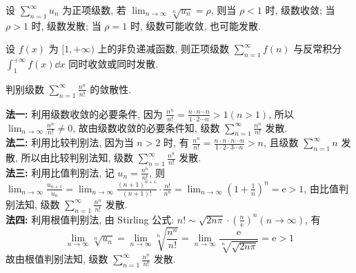 \begin{theorem}[根值审敛法]
    设 $\displaystyle \sum_{n=1}^{\infty} u_{n} $ 为正项级数, 若 $\displaystyle \lim _{n \rightarrow \infty} \sqrt[n]{u_{n}}=\rho $, 则当 $ \rho<1 $ 时, 级数收敛;
    当 $ \rho>1 $ 时, 级数发散; 当 $ \rho=1 $ 时, 级数可能收敛, 也可能发散.
\end{theorem}

\begin{theorem}[积分判别法]
    设 $ f(x) $ 为 $ [1,+\infty) $ 上的非负递减函数, 则正项级数 $\displaystyle  \sum_{n=1}^{\infty} f(n) $ 与反常积分 $\displaystyle \int_{1}^{+\infty} f(x) \dd x $ 同时收敛或同时发散.
\end{theorem}

\begin{example}
    判别级数 $\displaystyle  \sum_{n=1}^{\infty} \frac{n^{n}}{n!} $ 的敛散性.
\end{example}
\begin{solution}
    \textbf{法一: }利用级数收敛的必要条件, 因为 $\displaystyle  \frac{n^{n}}{n!}=\frac{n \cdot n \cdots n}{1 \cdot 2 \cdots n}>1(n>1) $, 所以 $\displaystyle  \lim _{n \rightarrow \infty} \frac{n^{n}}{n!} \neq 0 $, 故由级数收敛的必要条件知, 级数 $\displaystyle  \sum_{n=1}^{\infty} \frac{n^{n}}{n!} $ 发散.\\ 
    \textbf{法二: }利用比较判别法, 因为当 $ n>2 $ 时, 有 $\displaystyle  \frac{n^{n}}{n!}=\frac{n \cdot n \cdot n \cdots n}{1 \cdot 2 \cdot 3 \cdots n}>n $, 且级数 $\displaystyle  \sum_{n=1}^{\infty} n $ 发散, 所以由比较判别法知, 级数 $\displaystyle  \sum_{n=1}^{\infty} \frac{n^{n}}{n!} $ 发散.\\ 
    \textbf{法三: }利用比值判别法, 记 $\displaystyle  u_{n}=\frac{n^{n}}{n!} $, 则 $\displaystyle  \lim _{n \rightarrow \infty} \frac{u_{n+1}}{u_{n}}=\lim _{n \rightarrow \infty} \frac{(n+1)^{n+1}}{(n+1)!} \cdot \frac{n!}{n^{n}}=\lim _{n \rightarrow \infty}\left(1+\frac{1}{n}\right)^{n}=\mathrm{e}>1 $, 由比值判别法知, 级数 $\displaystyle  \sum_{n=1}^{\infty} \frac{n^{n}}{n!} $ 发散.\\ 
    \textbf{法四: }利用根值判别法, 由 Stirling 公式: $\displaystyle  n!\sim \sqrt{2 n \pi} \cdot\left(\frac{n}{\mathrm{e}}\right)^{n}(n \rightarrow \infty) $, 有
    $$
    \lim _{n \rightarrow \infty} \sqrt[n]{u_{n}}=\lim _{n \rightarrow \infty} \sqrt[n]{\frac{n^{n}}{n!}}=\lim _{n \rightarrow \infty} \frac{\mathrm{e}}{\sqrt[n]{\sqrt{2 n \pi}}}=\mathrm{e}>1 
    $$
    故由根值判别法知, 级数 $\displaystyle  \sum_{n=1}^{\infty} \frac{n^{n}}{n!} $ 发散.
\end{solution}

